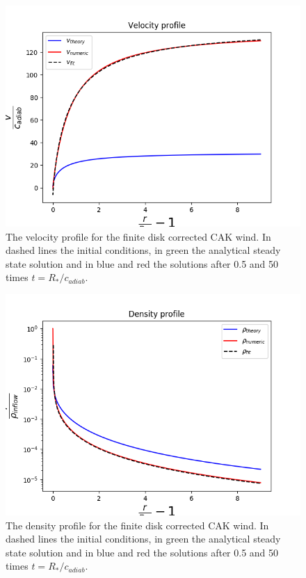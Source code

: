 \begin{figure}
\centering
\includegraphics[width = \textwidth]{CAK_fd_velocity_profile.png}
\caption{The velocity profile for the finite disk corrected CAK wind. In dashed lines the initial conditions, in green the analytical steady state solution and in blue and red the solutions after 0.5 and 50 times $t = R_*/c_{adiab}$.}
\label{fig: CAK_fd_v}
\end{figure}

\begin{figure}
\centering
\includegraphics[width = \textwidth]{CAK_fd_density_profile.png}
\caption{The density profile for the finite disk corrected CAK wind. In dashed lines the initial conditions, in green the analytical steady state solution and in blue and red the solutions after 0.5 and 50 times $t = R_*/c_{adiab}$.}
\label{fig: CAK_fd_rho}
\end{figure}
%
%

